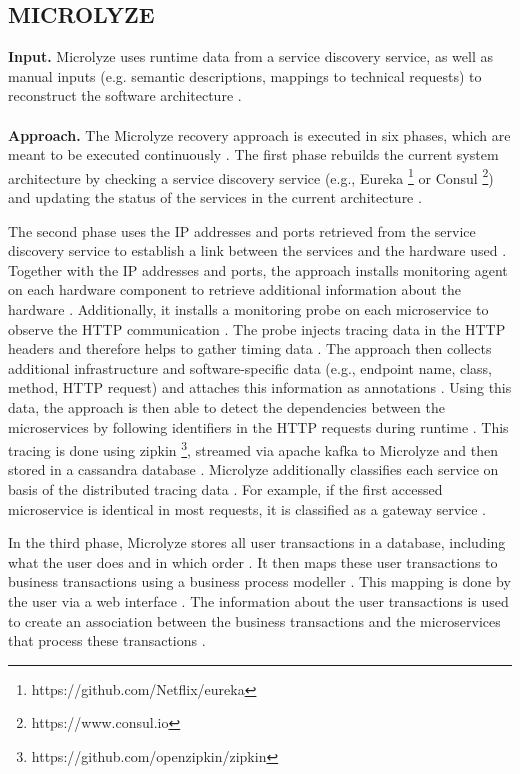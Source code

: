 \subsection{MICROLYZE}
\label{sec:Results:Microlyze}
\textbf{Input.}
Microlyze uses runtime data from a service discovery service, as well as manual inputs (e.g. semantic descriptions, mappings to technical requests) to reconstruct the software architecture \cite{Kleehaus2018}.
\\ \\
\textbf{Approach.}
The Microlyze recovery approach is executed in six phases, which are meant to be executed continuously \cite{Kleehaus2018}.
The first phase rebuilds the current system architecture by checking a service discovery service (e.g., Eureka \footnote{https://github.com/Netflix/eureka} or Consul \footnote{https://www.consul.io}) and updating the status of the services in the current architecture \cite{Kleehaus2018}.

The second phase uses the IP addresses and ports retrieved from the service discovery service to establish a link between the services and the hardware used \cite{Kleehaus2018}.
Together with the IP addresses and ports, the approach installs monitoring agent on each hardware component to retrieve additional information about the hardware \cite{Kleehaus2018}.
Additionally, it installs a monitoring probe on each microservice to observe the HTTP communication \cite{Kleehaus2018}.
The probe injects tracing data in the HTTP headers and therefore helps to gather timing data \cite{Kleehaus2018}.
The approach then collects additional infrastructure and software-specific data (e.g., endpoint name, class, method, HTTP request) and attaches this information as annotations \cite{Kleehaus2018}.
Using this data, the approach is then able to detect the dependencies between the microservices by following identifiers in the HTTP requests during runtime \cite{Kleehaus2018}.
This tracing is done using zipkin \footnote{https://github.com/openzipkin/zipkin}, streamed via apache kafka to Microlyze and then stored in a cassandra database \cite{Kleehaus2018}.
Microlyze additionally classifies each service on basis of the distributed tracing data \cite{Kleehaus2018}.
For example, if the first accessed microservice is identical in most requests, it is classified as a gateway service \cite{Kleehaus2018}.

In the third phase, Microlyze stores all user transactions in a database, including what the user does and in which order \cite{Kleehaus2018}.
It then maps these user transactions to business transactions using a business process modeller \cite{Kleehaus2018}.
This mapping is done by the user via a web interface \cite{Kleehaus2018}.
The information about the user transactions is used to create an association between the business transactions and the microservices that process these transactions \cite{Kleehaus2018}.

